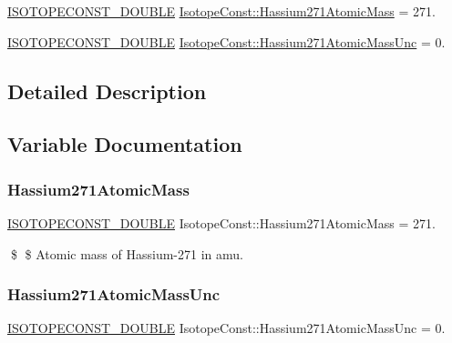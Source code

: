 \begin{DoxyCompactItemize}
\item 
\mbox{\hyperlink{group___isotope_const-_macros_ga8f45a7272ce02c0b4c65c44636ed719a}{I\+S\+O\+T\+O\+P\+E\+C\+O\+N\+S\+T\+\_\+\+D\+O\+U\+B\+LE}} \mbox{\hyperlink{group___isotope_const-_hassium-_hs271_ga4aabe72fdc952e3daf24b29281745b2e}{Isotope\+Const\+::\+Hassium271\+Atomic\+Mass}} = 271.
\item 
\mbox{\hyperlink{group___isotope_const-_macros_ga8f45a7272ce02c0b4c65c44636ed719a}{I\+S\+O\+T\+O\+P\+E\+C\+O\+N\+S\+T\+\_\+\+D\+O\+U\+B\+LE}} \mbox{\hyperlink{group___isotope_const-_hassium-_hs271_gac70116b24dbc63996136a876d5af9ad6}{Isotope\+Const\+::\+Hassium271\+Atomic\+Mass\+Unc}} = 0.
\end{DoxyCompactItemize}


\subsection{Detailed Description}


\subsection{Variable Documentation}
\mbox{\label{group___isotope_const-_hassium-_hs271_ga4aabe72fdc952e3daf24b29281745b2e}} 
\subsubsection{\texorpdfstring{Hassium271\+Atomic\+Mass}{Hassium271AtomicMass}}
{\footnotesize\ttfamily \mbox{\hyperlink{group___isotope_const-_macros_ga8f45a7272ce02c0b4c65c44636ed719a}{I\+S\+O\+T\+O\+P\+E\+C\+O\+N\+S\+T\+\_\+\+D\+O\+U\+B\+LE}} Isotope\+Const\+::\+Hassium271\+Atomic\+Mass = 271.}

\$ \$ Atomic mass of Hassium-\/271 in amu. \mbox{\label{group___isotope_const-_hassium-_hs271_gac70116b24dbc63996136a876d5af9ad6}} 
\subsubsection{\texorpdfstring{Hassium271\+Atomic\+Mass\+Unc}{Hassium271AtomicMassUnc}}
{\footnotesize\ttfamily \mbox{\hyperlink{group___isotope_const-_macros_ga8f45a7272ce02c0b4c65c44636ed719a}{I\+S\+O\+T\+O\+P\+E\+C\+O\+N\+S\+T\+\_\+\+D\+O\+U\+B\+LE}} Isotope\+Const\+::\+Hassium271\+Atomic\+Mass\+Unc = 0.}

